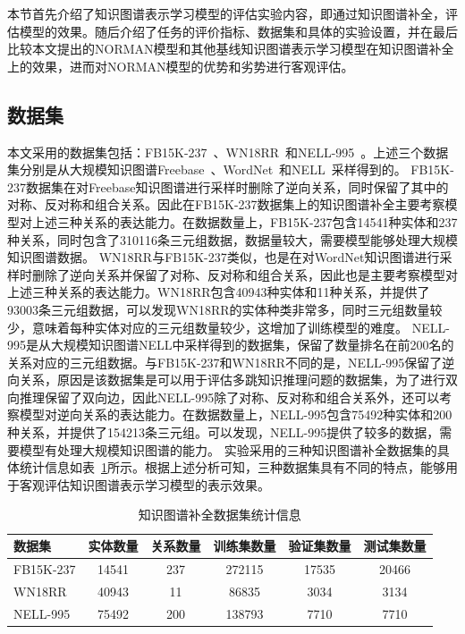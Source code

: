 \documentclass[algorithmlist, AutoFakeBold, AutoFakeSlant, figurelist, tablelist, nomlist, masters]{seuthesix}
\begin{document}
本节首先介绍了知识图谱表示学习模型的评估实验内容，即通过知识图谱补全，评估模型的效果。随后介绍了任务的评价指标、数据集和具体的实验设置，并在最后比较本文提出的NORMAN模型和其他基线知识图谱表示学习模型在知识图谱补全上的效果，进而对NORMAN模型的优势和劣势进行客观评估。

\subsection{数据集}
本文采用的数据集包括：FB15K-237~\cite{toutanova2015representing}、WN18RR~\cite{dettmers2018convolutional}和NELL-995~\cite{xiong2017deeppath}。上述三个数据集分别是从大规模知识图谱Freebase~\cite{bollacker2008freebase}、WordNet~\cite{glorot2010understanding}和NELL~\cite{carlson2010toward}采样得到的。
FB15K-237数据集在对Freebase知识图谱进行采样时删除了逆向关系，同时保留了其中的对称、反对称和组合关系。因此在FB15K-237数据集上的知识图谱补全主要考察模型对上述三种关系的表达能力。在数据数量上，FB15K-237包含14541种实体和237种关系，同时包含了310116条三元组数据，数据量较大，需要模型能够处理大规模知识图谱数据。
WN18RR与FB15K-237类似，也是在对WordNet知识图谱进行采样时删除了逆向关系并保留了对称、反对称和组合关系，因此也是主要考察模型对上述三种关系的表达能力。WN18RR包含40943种实体和11种关系，并提供了93003条三元组数据，可以发现WN18RR的实体种类非常多，同时三元组数量较少，意味着每种实体对应的三元组数量较少，这增加了训练模型的难度。
NELL-995是从大规模知识图谱NELL中采样得到的数据集，保留了数量排名在前200名的关系对应的三元组数据。与FB15K-237和WN18RR不同的是，NELL-995保留了逆向关系，原因是该数据集是可以用于评估多跳知识推理问题的数据集，为了进行双向推理保留了双向边，因此NELL-995除了对称、反对称和组合关系外，还可以考察模型对逆向关系的表达能力。在数据数量上，NELL-995包含75492种实体和200种关系，并提供了154213条三元组。可以发现，NELL-995提供了较多的数据，需要模型有处理大规模知识图谱的能力。
实验采用的三种知识图谱补全数据集的具体统计信息如表~\ref{Datasets1}所示。根据上述分析可知，三种数据集具有不同的特点，能够用于客观评估知识图谱表示学习模型的表示效果。
\begin{table}[]
  \centering
  \begin{tabular*}{0.95\textwidth}{@{\extracolsep{\fill}}lccccc}
  \toprule[1pt]
  数据集 & 实体数量 & 关系数量 & 训练集数量 & 验证集数量 & 测试集数量 \\ \hline
  FB15K-237 & 14541 & 237 & 272115 & 17535 & 20466\\
  WN18RR & 40943 & 11 & 86835 & 3034 & 3134\\
  NELL-995 & 75492 & 200 & 138793 & 7710 & 7710\\
  \bottomrule[1pt]
	\end{tabular*}
  \caption{知识图谱补全数据集统计信息}
  \label{Datasets1}
\end{table}
\end{document}
